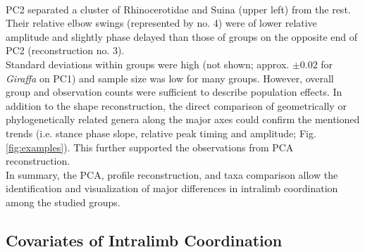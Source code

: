 \\PC2 separated a cluster of Rhinocerotidae and Suina (upper left) from the rest.
Their relative elbow swings (represented by no. 4) were of lower relative amplitude and slightly phase delayed than those of groups on the opposite end of PC2 (reconstruction no. 3).
\\Standard deviations within groups were high (not shown; approx. $\pm 0.02$ for \textit{Giraffa} on PC1) and sample size was low for many groups.
However, overall group and observation counts were sufficient to describe population effects.
In addition to the shape reconstruction, the direct comparison of geometrically or phylogenetically related genera along the major axes could confirm the mentioned trends (i.e. stance phase slope, relative peak timing and amplitude; Fig. \ref*{fig:examples}).
This further supported the observations from PCA reconstruction.
\\In summary, the PCA, profile reconstruction, and taxa comparison allow the identification and visualization of major differences in intralimb coordination among the studied groups.


\subsection{Covariates of Intralimb Coordination}

